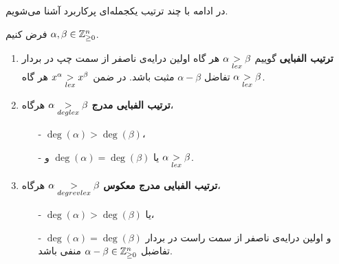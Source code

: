 در ادامه با چند ترتیب یکجمله‌ای پرکاربرد آشنا می‌شویم.
\begin{example}
فرض کنیم 
$\alpha, \beta \in \mathbb{Z}_{\geq 0}^{n}$.
\begin{enumerate}
\item 
\textbf{ترتیب الفبایی}
‌گوییم 
$\alpha \underset{lex}{>}\beta$
هر گاه اولین درایه‌ی ناصفر از سمت چپ در بردار تفاضل 
$\alpha - \beta$
مثبت باشد. در ضمن 
$x^{\alpha} \underset{lex}{>}x^{\beta}$
هر گاه 
$\alpha \underset{lex}{>}\beta$.
\item 
\textbf{ترتیب الفبایی مدرج}
	$\alpha \underset{deglex}{>}\beta$
	هرگاه،
	\begin{itemize}
		\item[-]
		$\deg(\alpha) > \deg(\beta)$،
		\item[-]
		یا 
		$\deg(\alpha) = \deg(\beta)$
		و
		$\alpha \underset{lex}{>}\beta$.
	\end{itemize}
\item
\textbf{ترتیب الفبایی مدرج معکوس}
$\alpha\underset{degrevlex}{>}\beta$
هرگاه،
\begin{itemize}
	\item[-]
	$\deg(\alpha) > \deg(\beta)$
	یا،
	\item[-]
	$\deg(\alpha) = \deg(\beta)$
	و اولین درایه‌ی ناصفر از سمت راست در بردار تفاضبل 
	$\alpha - \beta\in\mathbb{Z}_{\geq 0}^{n}$
	منفی باشد.
\end{itemize}	
\end{enumerate}
\end{example}
%
%		
%

